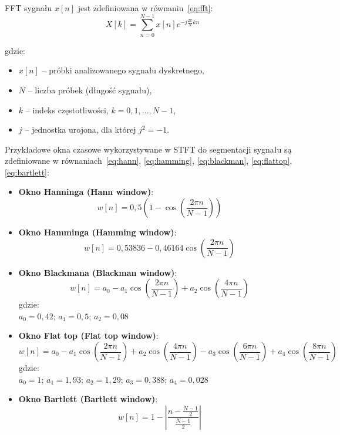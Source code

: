\documentclass{SGGW-thesis}
\begin{document}
FFT sygnału $x[n]$ jest zdefiniowana w równaniu~\eqref{eq:fft}:
\begin{equation}
X[k] = \sum_{n=0}^{N-1} x[n] e^{-j \frac{2\pi}{N}kn}
\label{eq:fft}
\end{equation}

gdzie:
\begin{itemize}
    \renewcommand{\labelitemi}{}
    \item $x[n]$ – próbki analizowanego sygnału dyskretnego,
    \item $N$ – liczba próbek (długość sygnału),
    \item $k$ – indeks częstotliwości, $k = 0, 1, \dots, N - 1$,
    \item $j$ – jednostka urojona, dla której $j^2 = -1$.
\end{itemize}

Przykładowe okna czasowe wykorzystywane w STFT do segmentacji sygnału są zdefiniowane w równaniach~\ref{eq:hann}, \ref{eq:hamming}, \ref{eq:blackman}, \ref{eq:flattop}, \ref{eq:bartlett}:
\begin{itemize}
    \item \textbf{Okno Hanninga (Hann window)}:
    \begin{equation}
    w[n] = 0{,}5 \left( 1 - \cos\left(\frac{2\pi n}{N - 1}\right) \right)
    \label{eq:hann}
    \end{equation}
    \item \textbf{Okno Hamminga (Hamming window)}:
    \begin{equation}
    w[n] = 0{,}53836 - 0{,}46164 \cos\left(\frac{2\pi n}{N - 1}\right)
    \label{eq:hamming}
    \end{equation}
    \item \textbf{Okno Blackmana (Blackman window)}:
    \begin{equation}
    w[n] = a_0 - a_1 \cos\left(\frac{2\pi n}{N - 1}\right) + a_2 \cos\left(\frac{4\pi n}{N - 1}\right)
    \label{eq:blackman}
    \end{equation}
    gdzie: \\
    $a_0 = 0{,}42$; $a_1 = 0{,}5$; $a_2 = 0{,}08$
    \item \textbf{Okno Flat top (Flat top window)}:
    \begin{equation}
    w[n] = a_0 - a_1 \cos\left(\frac{2\pi n}{N - 1}\right) + a_2 \cos\left(\frac{4\pi n}{N - 1}\right) - a_3 \cos\left(\frac{6\pi n}{N - 1}\right) + a_4 \cos\left(\frac{8\pi n}{N - 1}\right)
    \label{eq:flattop}
    \end{equation}
    gdzie: \\
    $a_0 = 1$; $a_1 = 1{,}93$; $a_2 = 1{,}29$; $a_3 = 0{,}388$; $a_4 = 0{,}028$
    \item \textbf{Okno Bartlett (Bartlett window)}:
    \begin{equation}
    w[n] = 1 - \left| \frac{n - \frac{N-1}{2}}{\frac{N-1}{2}} \right|
    \label{eq:bartlett}
    \end{equation}
\end{itemize}
\end{document}
